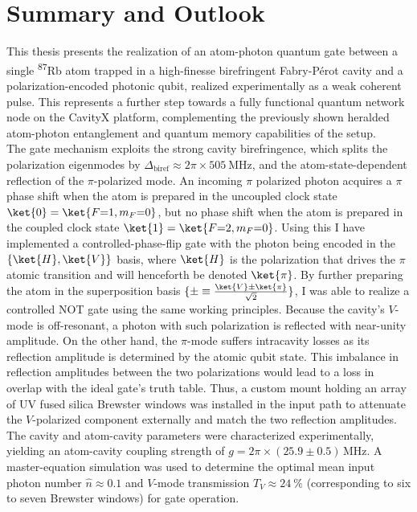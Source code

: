 \chapter{Summary and Outlook}

This thesis presents the realization of an atom-photon quantum gate between a single \textsuperscript{87}Rb atom trapped in a high-finesse birefringent Fabry-Pérot cavity and a polarization-encoded photonic qubit, realized experimentally as a weak coherent pulse. This represents a further step towards a fully functional quantum network node on the CavityX platform, complementing the previously shown heralded atom-photon entanglement \cite{HeraldedEntanglement} and quantum memory capabilities \cite{QuantumNetworkManuel} of the setup. \\

The gate mechanism exploits the strong cavity birefringence, which splits the polarization eigenmodes by $\Delta_\text{biref} \approx 2\pi \times \SI{505}{\mega\hertz}$, and the atom-state-dependent reflection of the $\pi$-polarized mode. An incoming $\pi$ polarized photon acquires a $\pi$ phase shift when the atom is prepared in the uncoupled clock state $\ket{0} = \ket{F{=}1, m_F{=}0}$, but no phase shift when the atom is prepared in the coupled clock state $\ket{1} = \ket{F{=}2, m_F{=}0}$. Using this I have implemented a controlled-phase-flip gate with the photon being encoded in the $\{\ket{H}, \ket{V}\}$ basis, where $\ket{H}$ is the polarization that drives the $\pi$ atomic transition and will henceforth be denoted $\ket{\pi}$. By further preparing the atom in the superposition basis $\{\pm\equiv\frac{\ket{V}\pm\ket{\pi}}{\sqrt{2}}\}$, I was able to realize a controlled NOT gate using the same working principles. Because the cavity's $V$-mode is off-resonant, a photon with such polarization is reflected with near-unity amplitude. On the other hand, the $\pi$-mode suffers intracavity losses as its reflection amplitude is determined by the atomic qubit state. This imbalance in reflection amplitudes between the two polarizations would lead to a loss in overlap with the ideal gate's truth table. Thus, a custom mount holding an array of UV fused silica Brewster windows was installed in the input path to attenuate the $V$-polarized component externally and match the two reflection amplitudes.\\

The cavity and atom-cavity parameters were characterized experimentally, yielding an atom-cavity coupling strength of $g = 2\pi \times (25.9 \pm 0.5)\,\text{MHz}$. A master-equation simulation was used to determine the optimal mean input photon number $\hat{n} \approx 0.1$ and $V$-mode transmission $T_V \approx \SI{24}{\percent}$ (corresponding to six to seven Brewster windows) for gate operation.\\


